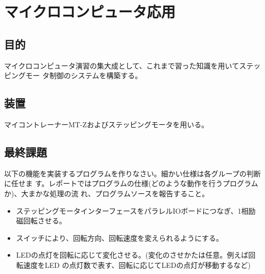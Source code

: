 \chapter{マイクロコンピュータ応用}

\section{目的}

マイクロコンピュータ演習の集大成として、これまで習った知識を用いてステッピングモー
タ制御のシステムを構築する。

\section{装置}

マイコントレーナーMT-Zおよびステッピングモータを用いる。

\section{最終課題}
以下の機能を実装するプログラムを作りなさい。細かい仕様は各グループの判断に任せま
す。レポートではプログラムの仕様(どのような動作を行うプログラムか)、大まかな処理の流
れ、プログラムソースを報告すること。

\begin{itemize}
\item ステッピングモータインターフェースをパラレルIOボードにつなぎ、1相励磁回転させる。
\item スイッチにより、回転方向、回転速度を変えられるようにする。
\item LEDの点灯を回転に応じて変化させる。(変化のさせかたは任意。例えば回転速度をLED
  の点灯数で表す、回転に応じてLEDの点灯が移動するなど)
\end{itemize}
